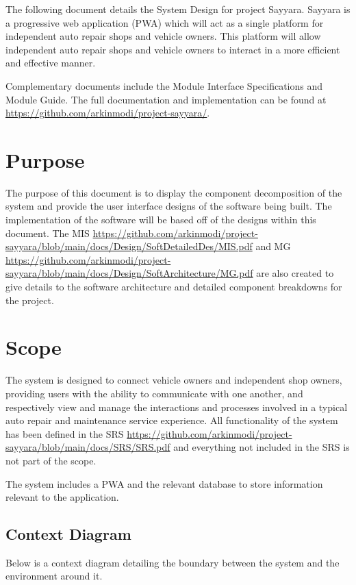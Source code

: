 \documentclass[12pt, titlepage]{article}
\begin{document}
The following document details the System Design for project Sayyara. Sayyara is a progressive web
application (PWA) which will act as a single platform for independent auto repair shops and vehicle
owners. This platform will allow independent auto repair shops and vehicle owners to interact in a
more efficient and effective manner.

Complementary documents include the Module Interface Specifications and Module Guide. The full
documentation and implementation can be found at
\url{https://github.com/arkinmodi/project-sayyara/}.

\section{Purpose}

The purpose of this document is to display the component decomposition of the system and provide
the user interface designs of the software being built. The implementation of the software will be
based off of the designs within this document. The MIS
\url{https://github.com/arkinmodi/project-sayyara/blob/main/docs/Design/SoftDetailedDes/MIS.pdf}
and MG
\url{https://github.com/arkinmodi/project-sayyara/blob/main/docs/Design/SoftArchitecture/MG.pdf}
are also created to give details to the software architecture and detailed component breakdowns for
the project.

\section{Scope}

The system is designed to connect vehicle owners and independent shop owners, providing users with
the ability to communicate with one another, and respectively view and manage the interactions and
processes involved in a typical auto repair and maintenance service experience. All functionality
of the system has been defined in the SRS
\url{https://github.com/arkinmodi/project-sayyara/blob/main/docs/SRS/SRS.pdf} and everything not
included in the SRS is not part of the scope.

The system includes a PWA and the relevant database to store information relevant to the
application.

\subsection{Context Diagram}

Below is a context diagram detailing the boundary between the system and the environment around it.
\end{document}
